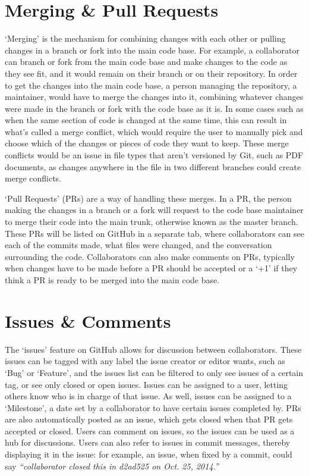 \section{Merging \& Pull Requests}
`Merging' is the mechanism for combining changes with each other or pulling changes in a branch or fork into the main code base. For example, a collaborator can branch or fork from the main code base and make changes to the code as they see fit, and it would remain on their branch or on their repository. In order to get the changes into the main code base, a person managing the repository, a maintainer, would have to merge the changes into it, combining whatever changes were made in the branch or fork with the code base as it is. In some cases such as when the same section of code is changed at the same time, this can result in what's called a merge conflict, which would require the user to manually pick and choose which of the changes or pieces of code they want to keep. These merge conflicts would be an issue in file types that aren't versioned by Git, such as PDF documents, as changes anywhere in the file in two different branches could create merge conflicts.

`Pull Requests' (PRs) are a way of handling these merges. In a PR, the person making the changes in a branch or a fork will request to the code base maintainer to merge their code into the main trunk, otherwise known as the master branch. These PRs will be listed on GitHub in a separate tab, where collaborators can see each of the commits made, what files were changed, and the conversation surrounding the code. Collaborators can also make comments on PRs, typically when changes have to be made before a PR should be accepted or a `+1' if they think a PR is ready to be merged into the main code base.

\section{Issues \& Comments}
The `issues' feature on GitHub allows for discussion between collaborators. These issues can be tagged with any label the issue creator or editor wants, such as `Bug' or `Feature', and the issues list can be filtered to only see issues of a certain tag, or see only closed or open issues. Issues can be assigned to a user, letting others know who is in charge of that issue. As well, issues can be assigned to a `Milestone', a date set by a collaborator to have certain issues completed by. PRs are also automatically posted as an issue, which gets closed when that PR gets accepted or closed. Users can comment on issues, so the issues can be used as a hub for discussions. Users can also refer to issues in commit messages, thereby displaying it in the issue: for example, an issue, when fixed by a commit, could say \textit{``collaborator closed this in d2ad525 on Oct. 25, 2014.''}

